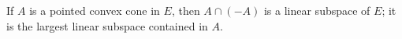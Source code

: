 If $A$ is a pointed convex cone in $E$, then $A \cap (-A)$ is a linear subspace of $E$; it is the largest linear subspace contained in $A$.